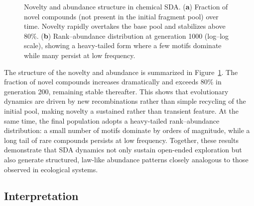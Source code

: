\documentclass[life,article,submit,pdftex,moreauthors]{Definitions/mdpi}
\begin{document}
\begin{figure}[H]
\centering
{}
\hfill
{}
\caption{Novelty and abundance structure in chemical SDA. (\textbf{a}) Fraction of novel compounds (not present in the initial fragment pool) over time. Novelty rapidly overtakes the base pool and stabilizes above 80\%. (\textbf{b}) Rank--abundance distribution at generation 1000 (log--log scale), showing a heavy-tailed form where a few motifs dominate while many persist at low frequency.}
\label{fig:chem-novel-rank}
\end{figure}

The structure of the novelty and abundance is summarized in Figure~\ref{fig:chem-novel-rank}. The fraction of novel compounds increases dramatically and exceeds 80\% in generation 200, remaining stable thereafter. This shows that evolutionary dynamics are driven by new recombinations rather than simple recycling of the initial pool, making novelty a sustained rather than transient feature. At the same time, the final population adopts a heavy-tailed rank--abundance distribution: a small number of motifs dominate by orders of magnitude, while a long tail of rare compounds persists at low frequency. Together, these results demonstrate that SDA dynamics not only sustain open-ended exploration but also generate structured, law-like abundance patterns closely analogous to those observed in ecological systems.


\subsection{Interpretation}
\end{document}
